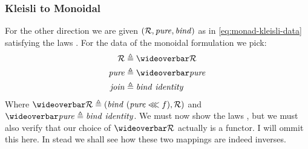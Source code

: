 \subsubsection{Kleisli to Monoidal}
For the other direction we are given $(\EndoR, \pure, \bind)$ as in
\ref{eq:monad-kleisli-data} satisfying the laws \kleislilaws. For the data of
the monoidal formulation we pick:
%
\begin{align}
\begin{split}
    \EndoR & \defeq \EndoRX \\
    \pure  & \defeq \pureX \\
    \join  & \defeq \bind\ \identity
\end{split}
\end{align}
%
Where $\EndoRX \defeq (\bind\ (\pure \lll f), \EndoR)$ and $\pureX \defeq
\bind\ \identity$. We must now show the laws \monoidallaws, but we must also
verify that our choice of $\EndoRX$ actually is a functor. I will ommit this
here. In stead we shall see how these two mappings are indeed inverses.

